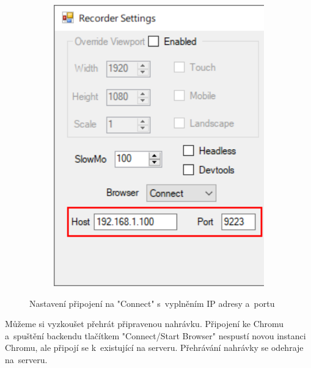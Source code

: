 \documentclass[12pt, a4paper, twoside]{article}
\begin{document}
\begin{figure}[H]
\begin{minipage}{0.45\textwidth}
\begin{subfigure}[t]{1.0\textwidth}
				\includegraphics[width=1.0\textwidth, right]{browserConnectFilled.png}
			\end{subfigure}	
		\end{minipage}
		\caption{Nastavení připojení na "Connect" s~vyplněním IP adresy a~portu}
	\end{figure}
	Můžeme si vyzkoušet přehrát připravenou nahrávku. Připojení ke Chromu a~spuštění backendu tlačítkem "Connect/Start Browser" nespustí novou instanci Chromu, ale připojí se k~existující na serveru. Přehrávání nahrávky se odehraje na~serveru.
\end{document}
